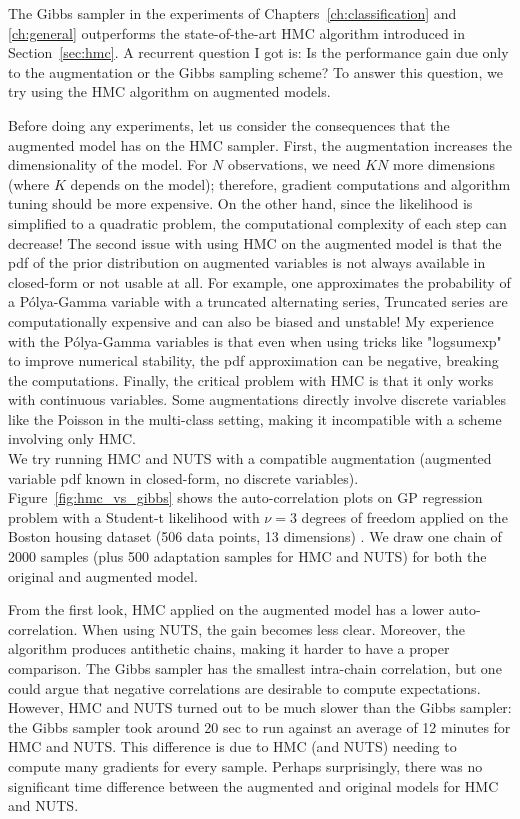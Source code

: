 The Gibbs sampler in the experiments of Chapters~\ref{ch:classification} and \ref{ch:general} outperforms the state-of-the-art \ac{HMC} algorithm introduced in Section~\ref{sec:hmc}.
A recurrent question I got is:
Is the performance gain due only to the augmentation or the Gibbs sampling scheme?
To answer this question, we try using the \ac{HMC} algorithm on augmented models.

Before doing any experiments, let us consider the consequences that the augmented model has on the \ac{HMC} sampler.
First, the augmentation increases the dimensionality of the model.
For $N$ observations, we need $KN$ more dimensions (where $K$ depends on the model); therefore, gradient computations and algorithm tuning should be more expensive.
On the other hand, since the likelihood is simplified to a quadratic problem, the computational complexity of each step can decrease!
The second issue with using \ac{HMC} on the augmented model is that the \ac{pdf} of the prior distribution on augmented variables is not always available in closed-form or not usable at all.
For example, one approximates the probability of a P\'olya-Gamma variable with a truncated alternating series,
Truncated series are computationally expensive and can also be biased and unstable!
My experience with the P\'olya-Gamma variables is that even when using tricks like "logsumexp" to improve numerical stability, the \ac{pdf} approximation can be negative, breaking the computations.
Finally, the critical problem with \ac{HMC} is that it only works with continuous variables.
Some augmentations directly involve discrete variables like the Poisson in the multi-class setting, making it incompatible with a scheme involving only \ac{HMC}.\\

We try running \ac{HMC} and \ac{NUTS} with a compatible augmentation (augmented variable \ac{pdf} known in closed-form, no discrete variables).
Figure~\ref{fig:hmc_vs_gibbs} shows the auto-correlation plots on \ac{GP} regression problem with a Student-t likelihood with $\nu=3$ degrees of freedom applied on the Boston housing dataset (506 data points, 13 dimensions) \cite{harrison1978hedonic}.
We draw one chain of 2000 samples (plus 500 adaptation samples for \ac{HMC} and \ac{NUTS}) for both the original and augmented model.

From the first look, \ac{HMC} applied on the augmented model has a lower auto-correlation.
When using \ac{NUTS}, the gain becomes less clear.
Moreover, the algorithm produces antithetic chains, making it harder to have a proper comparison.
The Gibbs sampler has the smallest intra-chain correlation, but one could argue that negative correlations are desirable to compute expectations.
However, \ac{HMC} and \ac{NUTS} turned out to be much slower than the Gibbs sampler:
the Gibbs sampler took around 20 sec to run against an average of 12 minutes for \ac{HMC} and \ac{NUTS}.
This difference is due to \ac{HMC} (and \ac{NUTS}) needing to compute many gradients for every sample.  
Perhaps surprisingly, there was no significant time difference between the augmented and original models for \ac{HMC} and \ac{NUTS}.

